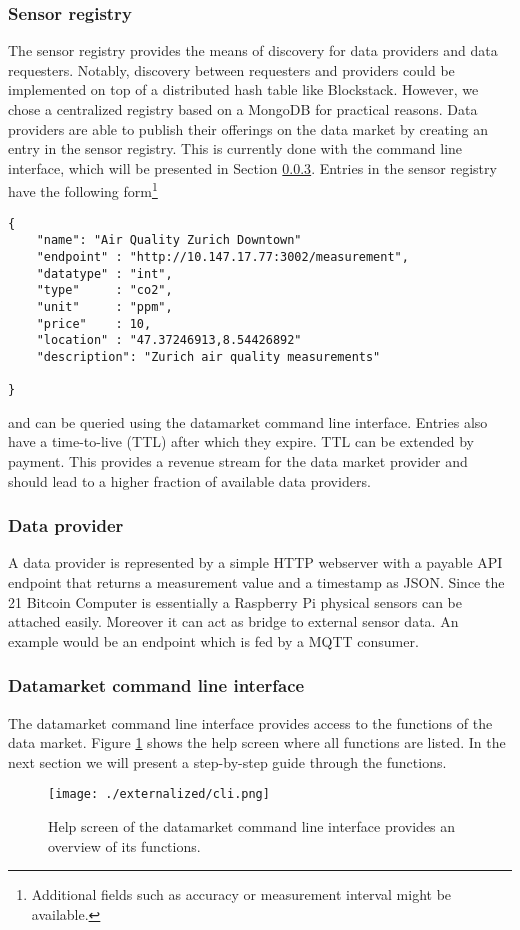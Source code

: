 \subsubsection{Sensor registry}
\label{sec:registry}
The sensor registry provides the means of discovery for data providers and data requesters. Notably, discovery between requesters and providers could be implemented on top of a distributed hash table like Blockstack\cite{blockstack}. However, we chose a centralized registry based on a MongoDB for practical reasons. Data providers are able to publish their offerings on the data market by creating an entry in the sensor registry. This is currently done with the command line interface, which will be presented in Section \ref{sec:cli}. Entries in the sensor registry have the following form\footnote{Additional fields such as accuracy or measurement interval might be available.}
\begin{lstlisting}[basicstyle=\ttfamily\tiny]
{     
    "name": "Air Quality Zurich Downtown"
    "endpoint" : "http://10.147.17.77:3002/measurement",
    "datatype" : "int",
    "type"     : "co2",
    "unit"     : "ppm",
    "price"    : 10,
    "location" : "47.37246913,8.54426892"
    "description": "Zurich air quality measurements"

}
\end{lstlisting}
and can be queried using the datamarket command line interface. Entries also have a time-to-live (TTL) after which they expire. TTL can be extended by payment. This provides a revenue stream for the data market provider and should lead to a higher fraction of available data providers. 
\subsubsection{Data provider}
A data provider is represented by a simple HTTP webserver with a payable API endpoint that returns a measurement value and a timestamp as JSON. Since the 21 Bitcoin Computer is essentially a Raspberry Pi physical sensors can be attached easily. Moreover it can act as bridge to external sensor data. An example would be an endpoint which is fed by a MQTT consumer.
\subsubsection{Datamarket command line interface}
\label{sec:cli}
The datamarket command line interface provides access to the functions of the data market. Figure \ref{fig:cli} shows the help screen where all functions are listed. In the next section we will present a step-by-step guide through the functions.
\begin{figure}
\begin{center}
\texttt{[image: ./externalized/cli.png]}
\caption{Help screen of the datamarket command line interface provides an overview of its functions.}
\label{fig:cli}
\end{center}
\end{figure}





